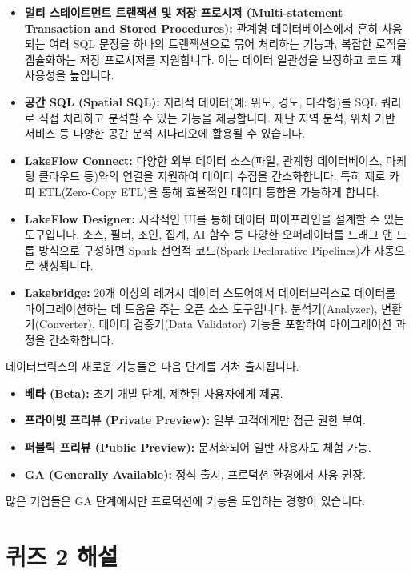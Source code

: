 \documentclass[11pt,a4paper]{article}
\theoremstyle{definition}
\begin{document}
\begin{itemize}
    \item \textbf{멀티 스테이트먼트 트랜잭션 및 저장 프로시저 (Multi-statement Transaction and Stored Procedures):} 관계형 데이터베이스에서 흔히 사용되는 여러 SQL 문장을 하나의 트랜잭션으로 묶어 처리하는 기능과, 복잡한 로직을 캡슐화하는 저장 프로시저를 지원합니다. 이는 데이터 일관성을 보장하고 코드 재사용성을 높입니다.
    \item \textbf{공간 SQL (Spatial SQL):} 지리적 데이터(예: 위도, 경도, 다각형)를 SQL 쿼리로 직접 처리하고 분석할 수 있는 기능을 제공합니다. 재난 지역 분석, 위치 기반 서비스 등 다양한 공간 분석 시나리오에 활용될 수 있습니다.
    \item \textbf{LakeFlow Connect:} 다양한 외부 데이터 소스(파일, 관계형 데이터베이스, 마케팅 클라우드 등)와의 연결을 지원하여 데이터 수집을 간소화합니다. 특히 제로 카피 ETL(Zero-Copy ETL)을 통해 효율적인 데이터 통합을 가능하게 합니다.
    \item \textbf{LakeFlow Designer:} 시각적인 UI를 통해 데이터 파이프라인을 설계할 수 있는 도구입니다. 소스, 필터, 조인, 집계, AI 함수 등 다양한 오퍼레이터를 드래그 앤 드롭 방식으로 구성하면 Spark 선언적 코드(Spark Declarative Pipelines)가 자동으로 생성됩니다.
    \item \textbf{Lakebridge:} 20개 이상의 레거시 데이터 스토어에서 데이터브릭스로 데이터를 마이그레이션하는 데 도움을 주는 오픈 소스 도구입니다. 분석기(Analyzer), 변환기(Converter), 데이터 검증기(Data Validator) 기능을 포함하여 마이그레이션 과정을 간소화합니다.
\end{itemize}

\begin{tcolorbox}[caution={기능 출시 단계}]
데이터브릭스의 새로운 기능들은 다음 단계를 거쳐 출시됩니다.
\begin{itemize}
    \item \textbf{베타 (Beta):} 초기 개발 단계, 제한된 사용자에게 제공.
    \item \textbf{프라이빗 프리뷰 (Private Preview):} 일부 고객에게만 접근 권한 부여.
    \item \textbf{퍼블릭 프리뷰 (Public Preview):} 문서화되어 일반 사용자도 체험 가능.
    \item \textbf{GA (Generally Available):} 정식 출시, 프로덕션 환경에서 사용 권장.
\end{itemize}
많은 기업들은 GA 단계에서만 프로덕션에 기능을 도입하는 경향이 있습니다.
\end{tcolorbox}

\newpage
\section*{퀴즈 2 해설}
\end{document}
